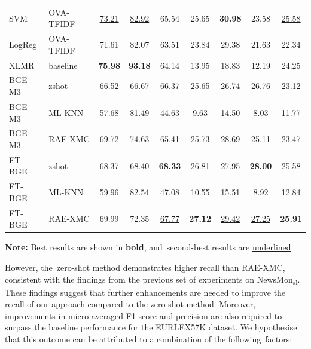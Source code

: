 \documentclass[make,article,accept,pdftex,moreauthors]{Definitions/mdpi}
\begin{document}
\begin{table}[H]
\begin{tabularx}{\textwidth}{l l C c C c C c C}
        \midrule
        SVM    & OVA-TFIDF    & \underline{73.21}  & \underline{82.92}  & 65.54  & 25.65  & \textbf{30.98}  & 23.58  & \underline{25.58}  \\
        LogReg & OVA-TFIDF    & 71.61  & 82.07 & 63.51 & 23.84 & 29.38 & 21.63 & 22.34 \\
        \midrule
        XLMR   & baseline     & \textbf{75.98}  & \textbf{93.18}  & 64.14  & 13.95  & 18.83  & 12.19  & 24.25  \\
        \midrule
        BGE-M3 & zshot        & 66.52  & 66.67  & 66.37  & 25.65  & 26.74  & 26.76  & 23.12  \\
        BGE-M3 & ML-KNN       & 57.68  & 81.49  & 44.63  & 9.63   & 14.50  & 8.03   & 11.77  \\
        BGE-M3 & RAE-XMC      & 69.72  & 74.63  & 65.41  & 25.73  & 28.69  & 25.11  & 23.47  \\
        \midrule
        FT-BGE & zshot        & 68.37  & 68.40  & \textbf{68.33}  & \underline{26.81}  & 27.95  & \textbf{28.00}  & 25.58  \\
        FT-BGE & ML-KNN       & 59.96  & 82.54  & 47.08  & 10.55  & 15.51  & 8.92   & 12.84  \\
        FT-BGE & RAE-XMC      & 69.99  & 72.35  & \underline{67.77}  & \textbf{27.12}  & \underline{29.42}  & \underline{27.25}  & \textbf{25.91}  \\
        \midrule
    \end{tabularx}
       \footnotesize {\textbf{Note:} Best results are shown in \textbf{bold}, and~second-best results are \underline{underlined}.}
    \label{tab:result_eurlex_all}
\end{table}
However, the~zero-shot method demonstrates higher recall than RAE-XMC, consistent with the findings from the previous set of experiments on NewsMon\textsubscript{sl}. 
These findings suggest that further enhancements are needed to improve the recall of our approach compared to the zero-shot method. 
Moreover, improvements in micro-averaged F1-score and precision are also required to surpass the baseline performance for the EURLEX57K dataset.
We hypothesise that this outcome can be attributed to a combination of the following~factors:
\end{document}
